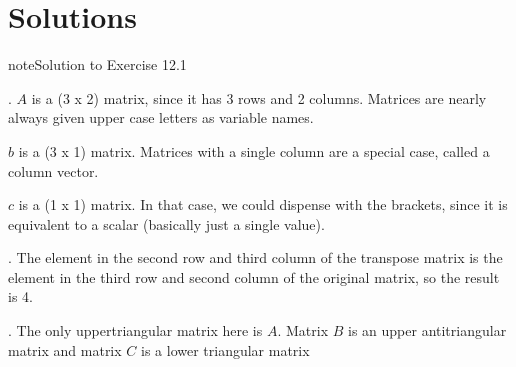 \documentclass[letterpaper,10pt,english]{jupyterBook}
\begin{document}
\section{Solutions}
\label{\detokenize{LinearAlgebra/linear_systems_matrices/matrices:solutions}} \label{LinearAlgebra/linear_systems_matrices/matrices:LinearAlgebra/linear_systems_matrices/matrices-solution-4}

\begin{sphinxadmonition}{note}{Solution to Exercise 12.1}



. \(A\) is a (3 x 2) matrix, since it has 3 rows and 2 columns.
Matrices are nearly always given upper case letters as variable names.

\sphinxAtStartPar
\(b\) is a (3 x 1) matrix.
Matrices with a single column are a special case, called a column vector.

\sphinxAtStartPar
\(c\) is a (1 x 1) matrix.
In that case, we could dispense with the brackets, since it is equivalent to a scalar (basically just a single value).

. The element in the second row and third column of the transpose matrix is the element in the third row and second column of the original matrix, so the result is \sphinxhyphen{}4.

. The only upper\sphinxhyphen{}triangular matrix here is \(A\). Matrix \(B\) is an upper anti\sphinxhyphen{}triangular matrix and matrix \(C\) is a lower triangular matrix
\end{sphinxadmonition}
 \label{LinearAlgebra/linear_systems_matrices/matrices:LinearAlgebra/linear_systems_matrices/matrices-solution-5}
\end{document}
